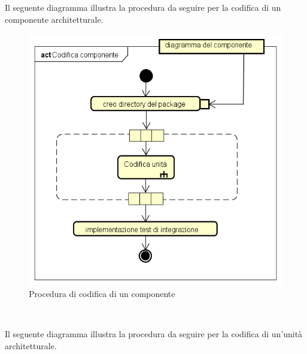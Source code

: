 \newpage

		 \label{procedura_comp}

			Il seguente diagramma illustra la procedura da seguire per la codifica di un componente architetturale.
			
			\begin{figure}[!ht]
				\centering
				\includegraphics[scale=0.7]{./img/codifica_componente.png}
				\caption[Procedura di codifica di un componente]{Procedura di codifica di un componente}
			\end{figure}\\

\newpage

		 \label{procedura_unit}

			Il seguente diagramma illustra la procedura da seguire per la codifica di un'unità architetturale.
			
